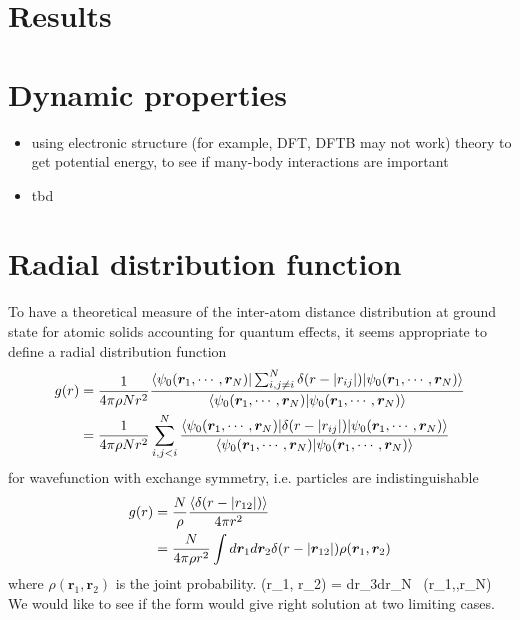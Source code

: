 \documentclass[11pt]{revtex4}
\begin{document}
\section{Results}

\section{Dynamic properties}
\begin{itemize}
  \item using electronic structure (for example, DFT, DFTB may not work)  theory to get potential energy, to see if many-body interactions are important 
  \item  tbd
\end{itemize}

\section{Radial distribution function}
To have a theoretical measure of the inter-atom distance distribution at ground state for atomic solids accounting for quantum effects, it seems appropriate to define a radial distribution function 
\begin{align}
 g(r) & = \frac{1}{4\pi \rho N r^2}\frac{\langle \psi_0(\bm r_1, \cdots, \bm r_N)  | \sum_{i,j \neq i}^N \delta(r - |r_{ij}|) | \psi_0(\bm r_1, \cdots, \bm r_N) \rangle}{\langle \psi_0(\bm r_1, \cdots, \bm r_N ) | \psi_0(\bm r_1, \cdots, \bm r_N) \rangle} \\ 
	& =   \frac{1}{4\pi \rho N r^2}\sum_{i,j < i}^N \frac{\langle \psi_0(\bm r_1, \cdots, \bm r_N)  | \delta(r - |r_{ij}|) | \psi_0(\bm r_1, \cdots, \bm r_N) \rangle}{\langle \psi_0(\bm r_1, \cdots, \bm r_N ) | \psi_0(\bm r_1, \cdots, \bm r_N) \rangle}
\end{align}
for wavefunction with exchange symmetry, i.e. particles are indistinguishable 
\begin{align}
 g(r) & = \frac{N}{\rho}\frac{\langle \delta(r - |r_{12}|) \rangle}{4\pi r^2}  \\ 
	&  = \frac{N}{4\pi \rho r^2} \int d\bm r_1 d\bm r_2 \delta(r - |\bm r_{12}|)\rho(\bm r_1,\bm r_2) 
\end{align}
where $\rho(\bm r_1, \bm r_2)$ is the joint probability. 
\be \rho(\bm r_1, \bm r_2) = \int d\bm r_3\cdots d\bm r_N~ \rho(\bm r_1,\cdots,\bm r_N) \ee 
We would like to see if the form would give right solution at two limiting cases. 
\end{document}
